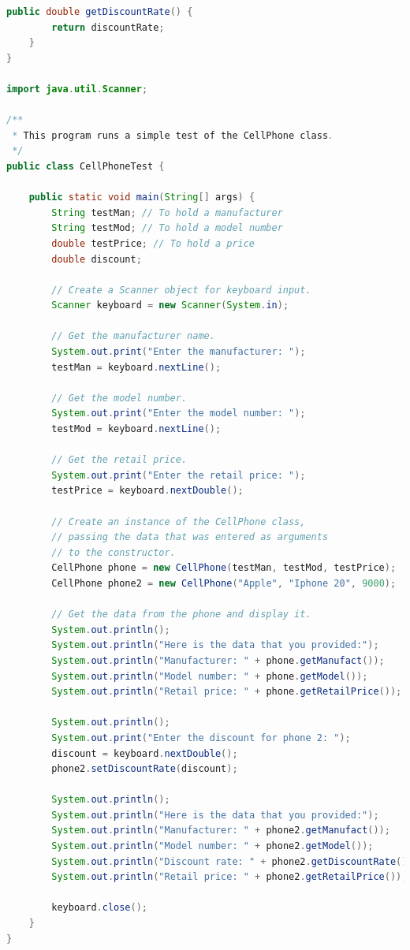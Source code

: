 \documentclass{article}
\begin{document}
\begin{lstlisting}[language=Java, caption=CellPhone and CellPhoneTest Classes]
    public double getDiscountRate() {
        return discountRate;
    }
}

import java.util.Scanner;

/**
 * This program runs a simple test of the CellPhone class.
 */
public class CellPhoneTest {

    public static void main(String[] args) {
        String testMan; // To hold a manufacturer
        String testMod; // To hold a model number
        double testPrice; // To hold a price
        double discount;

        // Create a Scanner object for keyboard input.
        Scanner keyboard = new Scanner(System.in);

        // Get the manufacturer name.
        System.out.print("Enter the manufacturer: ");
        testMan = keyboard.nextLine();

        // Get the model number.
        System.out.print("Enter the model number: ");
        testMod = keyboard.nextLine();

        // Get the retail price.
        System.out.print("Enter the retail price: ");
        testPrice = keyboard.nextDouble();

        // Create an instance of the CellPhone class,
        // passing the data that was entered as arguments
        // to the constructor.
        CellPhone phone = new CellPhone(testMan, testMod, testPrice);
        CellPhone phone2 = new CellPhone("Apple", "Iphone 20", 9000);

        // Get the data from the phone and display it.
        System.out.println();
        System.out.println("Here is the data that you provided:");
        System.out.println("Manufacturer: " + phone.getManufact());
        System.out.println("Model number: " + phone.getModel());
        System.out.println("Retail price: " + phone.getRetailPrice());

        System.out.println();
        System.out.print("Enter the discount for phone 2: ");
        discount = keyboard.nextDouble();
        phone2.setDiscountRate(discount);

        System.out.println();
        System.out.println("Here is the data that you provided:");
        System.out.println("Manufacturer: " + phone2.getManufact());
        System.out.println("Model number: " + phone2.getModel());
        System.out.println("Discount rate: " + phone2.getDiscountRate());
        System.out.println("Retail price: " + phone2.getRetailPrice());

        keyboard.close();
    }
}
\end{lstlisting}
\end{document}
